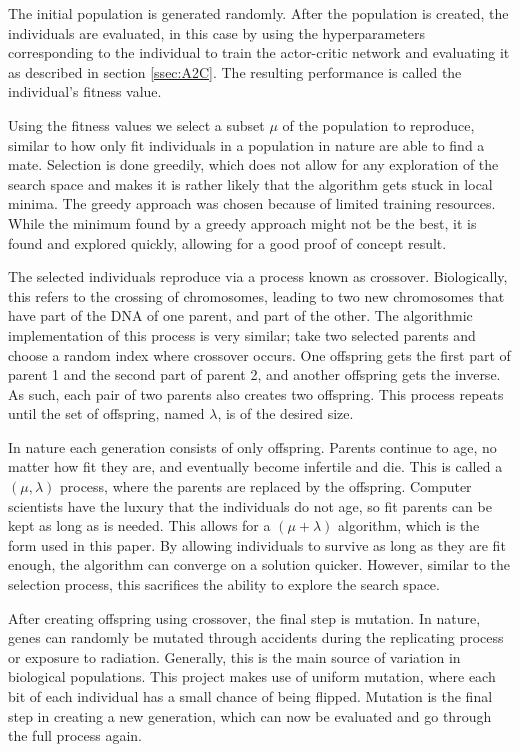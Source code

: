 \documentclass{article}
\begin{document}
The initial population is generated randomly.
After the population is created, the individuals are evaluated, in this case by using the hyperparameters corresponding to the individual to train the actor-critic network and evaluating it as described in section \ref{ssec:A2C}.
The resulting performance is called the individual's fitness value. 

Using the fitness values we select a subset $\mu$ of the population to reproduce, similar to how only fit individuals in a population in nature are able to find a mate.
Selection is done greedily, which does not allow for any exploration of the search space and makes it is rather likely that the algorithm gets stuck in local minima.
The greedy approach was chosen because of limited training resources.
While the minimum found by a greedy approach might not be the best, it is found and explored quickly, allowing for a good proof of concept result.

The selected individuals reproduce via a process known as crossover.
Biologically, this refers to the crossing of chromosomes, leading to two new chromosomes that have part of the DNA of one parent, and part of the other.
The algorithmic implementation of this process is very similar; take two selected parents and choose a random index where crossover occurs.
One offspring gets the first part of parent 1 and the second part of parent 2, and another offspring gets the inverse.
As such, each pair of two parents also creates two offspring.
This process repeats until the set of offspring, named $\lambda$, is of the desired size. 

In nature each generation consists of only offspring.
Parents continue to age, no matter how fit they are, and eventually become infertile and die.
This is called a $(\mu, \lambda)$ process, where the parents are replaced by the offspring.
Computer scientists have the luxury that the individuals do not age, so fit parents can be kept as long as is needed.
This allows for a $(\mu+\lambda)$ algorithm, which is the form used in this paper.
By allowing individuals to survive as long as they are fit enough, the algorithm can converge on a solution quicker. However, similar to the selection process, this sacrifices the ability to explore the search space. 

After creating offspring using crossover, the final step is mutation.
In nature, genes can randomly be mutated through accidents during the replicating process or exposure to radiation.
Generally, this is the main source of variation in biological populations.
This project makes use of uniform mutation, where each bit of each individual has a small chance of being flipped.
Mutation is the final step in creating a new generation, which can now be evaluated and go through the full process again.
\end{document}
